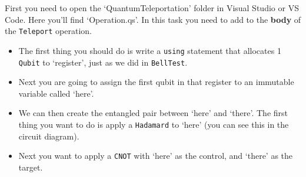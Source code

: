 \documentclass[a4paper]{article}
\begin{document}
First you need to open the `QuantumTeleportation' folder in Visual Studio or VS Code. Here you'll find `Operation.qs'. In this task you need to add to the \textbf{body} of the \verb$Teleport$ operation. 
\begin{itemize}
\item The first thing you should do is write a \verb$using$ statement that allocates 1 \verb$Qubit$ to `register', just as we did in \verb$BellTest$.
\item Next you are going to assign the first qubit in that register to an immutable variable called `here'.
\item We can then create the entangled pair between `here' and `there'. The first thing you want to do is apply a \verb$Hadamard$ to `here' (you can see this in the circuit diagram).
\item Next you want to apply a \verb$CNOT$ with `here' as the control, and `there' as the target.
\end{itemize}
\end{document}
